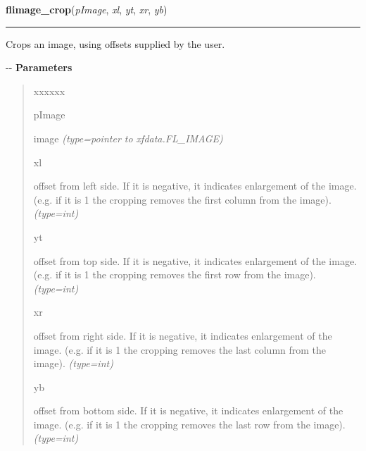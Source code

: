     \label{xformslib:flflimage:flimage_crop}

    \vspace{0.5ex}

\hspace{.8\funcindent}\begin{boxedminipage}{\funcwidth}

    \raggedright \textbf{flimage\_crop}(\textit{pImage}, \textit{xl}, \textit{yt}, \textit{xr}, \textit{yb})

    \vspace{-1.5ex}

    \rule{\textwidth}{0.5\fboxrule}
\setlength{\parskip}{2ex}

Crops an image, using offsets supplied by the user.

-{}-
\setlength{\parskip}{1ex}
      \textbf{Parameters}
      \vspace{-1ex}

      \begin{quote}
        \begin{Ventry}{xxxxxx}

          \item[pImage]


image
            {\it (type=pointer to xfdata.FL\_IMAGE)}

          \item[xl]


offset from left side. If it is negative, it indicates enlargement of
the image. (e.g. if it is 1 the cropping removes the first column from
the image).
            {\it (type=int)}

          \item[yt]


offset from top side. If it is negative, it indicates enlargement of
the image. (e.g. if it is 1 the cropping removes the first row from
the image).
            {\it (type=int)}

          \item[xr]


offset from right side. If it is negative, it indicates enlargement
of the image. (e.g. if it is 1 the cropping removes the last column
from the image).
            {\it (type=int)}

          \item[yb]


offset from bottom side. If it is negative, it indicates enlargement
of the image. (e.g. if it is 1 the cropping removes the last row from
the image).
            {\it (type=int)}


\end{Ventry}
\end{quote}
\end{boxedminipage}
